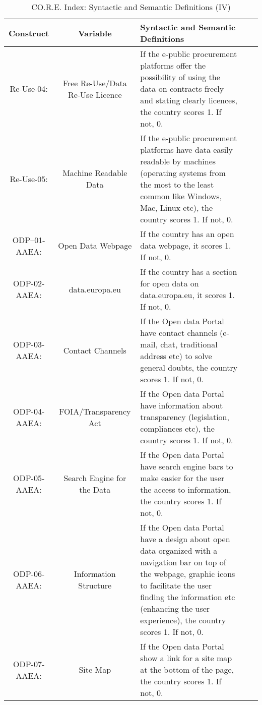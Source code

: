 \documentclass[a4paper, twoside]{report}
\begin{document}
\begin{table}[htbp]
  \centering
  \caption{CO.R.E. Index: Syntactic and Semantic Definitions (IV)}
   \tabcolsep=0.80cm
	\renewcommand{\arraystretch}{2.3}
	\begin{adjustbox}{max width=\linewidth}
       \begin{tabular}{ccp{30em}p{35em}p{31.335em}}
    \toprule
    Construct & Variable & Syntactic and Semantic Definitions \\
    \midrule
        Re-Use-04: & \cellcolor[rgb]{ .749,  .749,  .749}Free Re-Use/Data Re-Use Licence & \cellcolor[rgb]{ .749,  .749,  .749}If the e-public procurement platforms offer the possibility of using the data on contracts freely and stating clearly licences, the country scores 1. If not, 0. \\
    Re-Use-05: & \cellcolor[rgb]{ .749,  .749,  .749}Machine Readable Data & \cellcolor[rgb]{ .749,  .749,  .749}If the e-public procurement platforms have data easily readable by machines (operating systems from the most to the least common like Windows, Mac, Linux etc), the country scores 1. If not, 0. \\
    \midrule
    ODP--01-AAEA: & Open Data Webpage & If the country has an open data webpage, it scores 1. If not, 0.   \\
    ODP-02-AAEA: & data.europa.eu & If the country has a section for open data on data.europa.eu, it scores 1. If not, 0.   \\
    ODP-03-AAEA: & Contact Channels & If the Open data Portal have contact channels (e-mail, chat, traditional address etc) to solve general doubts, the country scores 1. If not, 0. \\
    ODP-04-AAEA: & FOIA/Transparency Act & If the Open data Portal have information about transparency (legislation, compliances etc), the country scores 1. If not, 0. \\
    ODP-05-AAEA: & Search Engine for the Data & If the Open data Portal have search engine bars to make easier for the user the access to information, the country scores 1. If not, 0. \\
    ODP-06-AAEA: & Information Structure & If the Open data Portal have a design about open data organized with a navigation bar on top of the webpage, graphic icons to facilitate the user finding the information etc (enhancing the user experience), the country scores 1. If not, 0. \\
    ODP-07-AAEA: & Site Map & If the Open data Portal show a link for a site map at the bottom of the page, the country scores 1. If not, 0. \\

\end{tabular}
\end{adjustbox}
\end{table}
\end{document}
